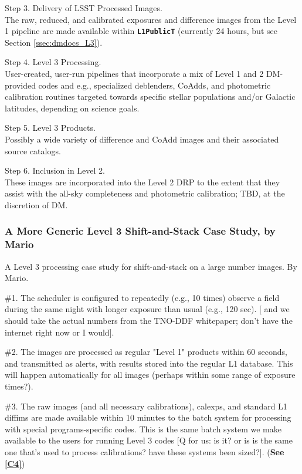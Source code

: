 \documentclass[DM,lsstdraft,toc]{lsstdoc}
\begin{document}
Step 3. Delivery of LSST Processed Images. \\ The raw, reduced, and calibrated exposures and difference images from the Level 1 pipeline are made available within {\tt \textbf{L1PublicT}} (currently 24 hours, but see Section \ref{ssec:dmdocs_L3}).

Step 4. Level 3 Processing. \\ User-created, user-run pipelines that incorporate a mix of Level 1 and 2 DM-provided codes and e.g., specialized deblenders, CoAdds, and photometric calibration routines targeted towards specific stellar populations and/or Galactic latitudes, depending on science goals. 

Step 5. Level 3 Products. \\ Possibly a wide variety of difference and CoAdd images and their associated source catalogs.

Step 6. Inclusion in Level 2. \\ These images are incorporated into the Level 2 DRP to the extent that they assist with the all-sky completeness and photometric calibration; TBD, at the discretion of DM.


\subsubsection{A More Generic Level 3 Shift-and-Stack Case Study, by Mario}\label{sssec:science_dmsums_generic}

A Level 3 processing case study for shift-and-stack on a large number images. By Mario.

\#1. The scheduler is configured to repeatedly (e.g., 10 times) observe a field during the same night with longer exposure than usual (e.g., 120 sec). [ and we should take the actual numbers from the TNO-DDF whitepaper; don't have the internet right now or I would].

\#2. The images are processed as regular "Level 1" products within 60 seconds, and transmitted as alerts, with results stored into the regular L1 database. This will happen automatically for all images (perhaps within some range of exposure times?).

\#3. The raw images (and all necessary calibrations), calexps, and standard L1 diffims are made available within 10 minutes to the batch system for processing with special programs-specific codes. This is the same batch system we make available to the users for running Level 3 codes [Q for us: is it? or is is the same one that's used to process calibrations? have these systems been sized?]. (\textbf{See \ref{C4}})
\end{document}
